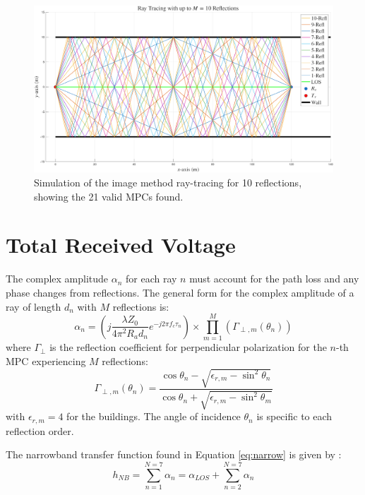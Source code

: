 \begin{figure}
	\centering
	\includegraphics[width=\linewidth]{content/4-images/ray-tracing-10-reflections.png}
	\caption{Simulation of the image method ray-tracing for 10 reflections, showing the 21 valid MPCs found.}
	\label{fig:raytracing-3reflex}
\end{figure}



\section{Total Received Voltage}
The complex amplitude $\alpha_n$ for each ray $n$ must account for the path loss and any phase changes from reflections. The general form for the complex amplitude of a ray of length $d_n$ with $M$ reflections is:
\begin{equation}
	\alpha_n = \left( j \frac{\lambda Z_0}{4\pi^2 R_a d_n} e^{-j2\pi f_c \tau_n} \right) \times \prod_{m=1}^{M}(\Gamma_{\perp, m}(\theta_{n}))
\end{equation}
where $\Gamma_{\perp}$ is the reflection coefficient for perpendicular polarization for the $n$-th MPC experiencing $M$ reflections:
\begin{equation}
	\Gamma_{\perp, m}(\theta_n) = \frac{\cos\theta_n - \sqrt{\epsilon_{r, m} - \sin^2\theta_n}}{\cos\theta_n + \sqrt{\epsilon_{r, m} - \sin^2\theta_m}}
\end{equation}
with $\epsilon_{r,m} = 4$ for the buildings. The angle of incidence $\theta_n$ is specific to each reflection order.

The narrowband transfer function found in Equation \eqref{eq:narrow} is given by :
\begin{equation}
	h_{NB} = \sum_{n=1}^{N=7} \alpha_n = \alpha_{LOS} + \sum_{n=2}^{N=7} \alpha_n
\end{equation}


